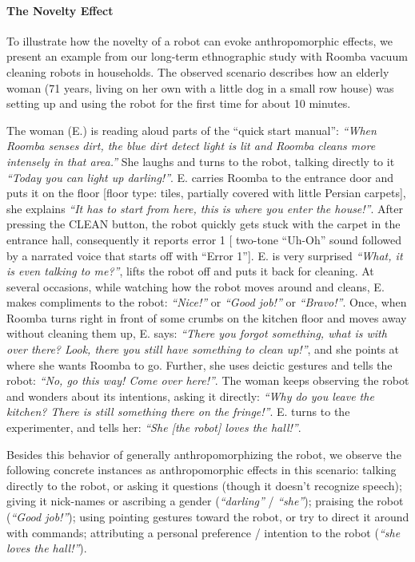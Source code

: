 \documentclass{frontiersSCNS} %
\begin{document}
\paragraph{The Novelty Effect}
\label{sec:noveltyeffect}


To illustrate how the novelty of a robot can evoke anthropomorphic effects, we
present an example from our long-term ethnographic study with Roomba vacuum
cleaning robots in households. The observed scenario describes how an elderly
woman (71 years, living on her own with a little dog in a small row house) was
setting up and using the robot for the first time for about 10 minutes.

The woman (E.) is reading aloud parts of the ``quick start manual'': \emph{``When
Roomba senses dirt, the blue dirt detect light is lit and Roomba cleans more
intensely in that area.''} She laughs and turns to the robot, talking directly to
it \emph{``Today you can light up darling!''}. E. carries Roomba to the entrance
door and puts it on the floor [floor type: tiles, partially covered with little
Persian carpets], she explains \emph{``It has to start from here, this is where
you enter the house!''}. After pressing the CLEAN button, the robot quickly gets
stuck with the carpet in the entrance hall, consequently it reports error 1 [
two-tone ``Uh-Oh'' sound followed by a narrated voice that starts off with ``Error
1'']. E. is very surprised \emph{``What, it is even talking to me?''}, lifts the
robot off and puts it back for cleaning. At several occasions, while watching
how the robot moves around and cleans, E. makes compliments to the robot:
\emph{``Nice!''} or \emph{``Good job!''} or \emph{``Bravo!''}. Once, when Roomba turns
right in front of some crumbs on the kitchen floor and moves away without
cleaning them up, E. says: \emph{``There you forgot something, what is with over
there? Look, there you still have something to clean up!''}, and she points at
where she wants Roomba to go. Further, she uses deictic gestures and tells the
robot: \emph{``No, go this way! Come over here!''}. The woman keeps observing the
robot and wonders about its intentions, asking it directly: \emph{``Why do you
leave the kitchen? There is still something there on the fringe!''}. E. turns to
the experimenter, and tells her: \emph{``She [the robot] loves the hall!''}.

Besides this behavior of generally anthropomorphizing the robot, we observe the
following concrete instances as anthropomorphic effects in this scenario:
talking directly to the robot, or asking it questions (though it doesn't
recognize speech); giving it nick-names or ascribing a gender (\emph{``darling''}
/ \emph{``she''}); praising the robot (\emph{``Good job!''}); using pointing
gestures toward the robot, or try to direct it around with commands; attributing
a personal preference / intention to the robot (\emph{``she loves the hall!''}).
\end{document}
